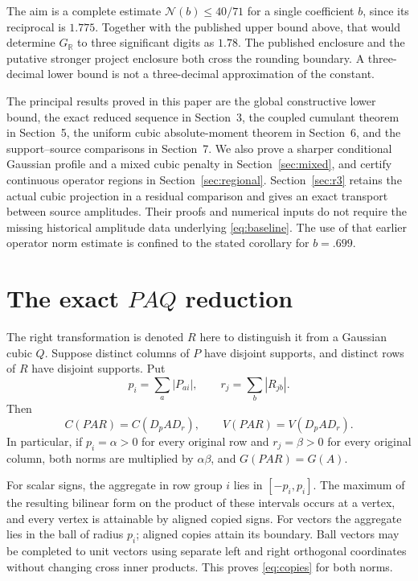 \documentclass[11pt]{article}
\newcommand{\R}{\mathbb R}
\newcommand{\GR}{G_{\R}}
\newcommand{\N}{\mathcal N}
\begin{document}
The aim is a complete estimate $\N(b)\le40/71$ for a single
coefficient $b$, since its reciprocal is $1.775$. Together with the
published upper bound above, that would determine $\GR$ to three
significant digits as $1.78$. The published enclosure and the putative
stronger project enclosure both cross the rounding boundary. A three-decimal lower bound is not a
three-decimal approximation of the constant.

The principal results proved in this paper are the global constructive
lower bound, the exact reduced sequence in Section~3, the coupled cumulant theorem in Section~5, the uniform cubic
absolute-moment theorem in Section~6, and the support--source comparisons
in Section~7. We also prove a sharper conditional Gaussian profile and a
mixed cubic penalty in Section~\ref{sec:mixed}, and certify continuous
operator regions in Section~\ref{sec:regional}. Section~\ref{sec:r3}
retains the actual cubic projection in a residual comparison and gives
an exact transport between source amplitudes. Their proofs and numerical inputs do not require the missing
historical amplitude data underlying \eqref{eq:baseline}. The use of that
earlier operator norm estimate is confined to the stated corollary for
$b=.699$.

\section{The exact $PAQ$ reduction}
The right transformation is denoted $R$ here to distinguish it from a
Gaussian cubic $Q$. Suppose distinct columns of $P$ have disjoint supports,
and distinct rows of $R$ have disjoint supports. Put
\[
 p_i=\sum_a|P_{ai}|,\qquad r_j=\sum_b|R_{jb}|.
\]
Then
\begin{equation}\label{eq:copies}
 C(PAR)=C(D_pAD_r),\qquad V(PAR)=V(D_pAD_r).
\end{equation}
In particular, if $p_i=\alpha>0$ for every original row and
$r_j=\beta>0$ for every original column, both norms are multiplied by
$\alpha\beta$, and $G(PAR)=G(A)$.

For scalar signs, the aggregate in row group $i$ lies in
$[-p_i,p_i]$. The maximum of the resulting bilinear form on the product
of these intervals occurs at a vertex, and every vertex is attainable
by aligned copied signs. For vectors the aggregate lies in the ball of
radius $p_i$; aligned copies attain its boundary. Ball vectors may be
completed to unit vectors using separate left and right orthogonal
coordinates without changing cross inner products. This proves
\eqref{eq:copies} for both norms.
\end{document}

